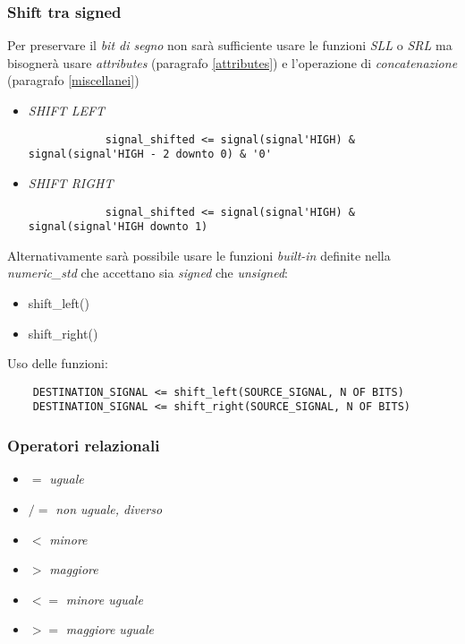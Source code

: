 \documentclass{article}
\begin{document}
\subsubsection{Shift tra signed} \label{signedshift}
Per preservare il \textit{bit di segno} non sarà sufficiente usare le funzioni \textit{SLL} o \textit{SRL} ma bisognerà usare \textit{attributes} (paragrafo \ref{attributes}) e l'operazione di \textit{concatenazione} (paragrafo \ref{miscellanei})

\begin{itemize}
	\item \textit{SHIFT LEFT}
		\begin{verbatim}
		    signal_shifted <= signal(signal'HIGH) & signal(signal'HIGH - 2 downto 0) & '0'
		\end{verbatim}
	\item \textit{SHIFT RIGHT}
		\begin{verbatim}
		    signal_shifted <= signal(signal'HIGH) & signal(signal'HIGH downto 1)
		\end{verbatim}
\end{itemize}

Alternativamente sarà possibile usare le funzioni \textit{built-in} definite nella \textit{numeric\_std} che accettano sia \textit{signed} che \textit{unsigned}:
\begin{itemize}
	\item shift\_left()
	\item shift\_right()
\end{itemize}

Uso delle funzioni:
\begin{verbatim}
    DESTINATION_SIGNAL <= shift_left(SOURCE_SIGNAL, N OF BITS)
    DESTINATION_SIGNAL <= shift_right(SOURCE_SIGNAL, N OF BITS)
\end{verbatim}
\subsubsection{Operatori relazionali}
\begin{itemize}
	\item \(=\) \textit{uguale}
	\item \(/=\) \textit{non uguale, diverso}
	\item \(<\) \textit{minore}
	\item \(>\) \textit{maggiore}
	\item \(<=\) \textit{minore uguale}
	\item \(>=\) \textit{maggiore uguale}
\end{itemize}
\end{document}
